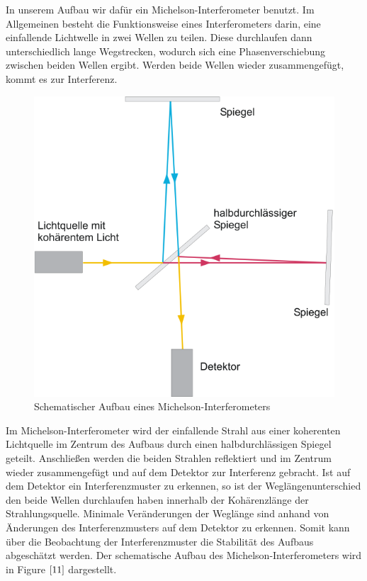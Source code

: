 \documentclass[12pt,a4paper]{article}
\begin{document}
In unserem Aufbau wir dafür ein Michelson-Interferometer benutzt. Im Allgemeinen besteht die Funktionsweise eines Interferometers darin, eine einfallende Lichtwelle in zwei Wellen zu teilen. Diese durchlaufen dann unterschiedlich lange Wegstrecken, wodurch sich eine Phasenverschiebung zwischen beiden Wellen ergibt. Werden beide Wellen wieder zusammengefügt, kommt es zur Interferenz. \begin{figure}[h]
	\includegraphics[scale = 0.5]{Michelson.png}
	\centering
	\caption{Schematischer Aufbau eines Michelson-Interferometers}
	\label{11}
\end{figure}Im Michelson-Interferometer wird der einfallende Strahl aus einer koherenten Lichtquelle im Zentrum des Aufbaus durch einen halbdurchlässigen Spiegel geteilt. Anschließen werden die beiden Strahlen reflektiert und im Zentrum wieder zusammengefügt und auf dem Detektor zur Interferenz gebracht. Ist auf dem Detektor ein Interferenzmuster zu erkennen, so ist der Weglängenunterschied den beide Wellen durchlaufen haben innerhalb der Kohärenzlänge der Strahlungsquelle. Minimale Veränderungen der Weglänge sind anhand von Änderungen des Interferenzmusters auf dem Detektor zu erkennen. Somit kann über die Beobachtung der Interferenzmuster die Stabilität des Aufbaus abgeschätzt werden. Der schematische Aufbau des Michelson-Interferometers wird in Figure $\ref{11}$ dargestellt.
\end{document}

